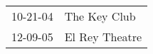 \begin{supertabular}{p{0.07\textwidth}p{0.23\textwidth}}
 10-21-04 &    The Key Club \\
 12-09-05 &  El Rey Theatre \\
\end{supertabular}
